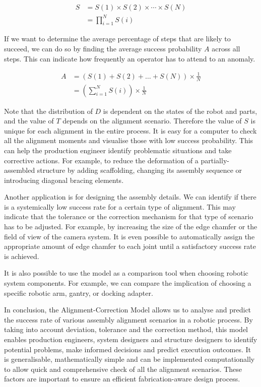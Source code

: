 \begin{align} \label{eq:total-probability-success}
    S &= S(1) \times S(2) \times \cdots \times S(N)\nonumber \\
      &= \prod_{i=1}^{N} S(i)
\end{align}

If we want to determine the average percentage of steps that are likely to succeed, we can do so by finding the average success probability $A$ across all steps. This can indicate how frequently an operator has to attend to an anomaly.

\begin{align} \label{eq:average-step-success-probability}
    A &= (S(1) + S(2) + \ldots + S(N)) \times \frac{1}{N}\nonumber \\
      &= \left(\sum_{i=1}^{N} S(i)\right) \times \frac{1}{N}
\end{align}

Note that the distribution of $D$ is dependent on the states of the robot and parts, and the value of $T$ depends on the alignment scenario. Therefore the value of $S$ is unique for each alignment in the entire process. It is easy for a computer to check all the alignment moments and visualise those with low success probability. This can help the production engineer identify problematic situations and take corrective actions. For example, to reduce the deformation of a partially-assembled structure by adding scaffolding, changing its assembly sequence or introducing diagonal bracing elements.

Another application is for designing the assembly details. We can identify if there is a systemically low success rate for a certain type of alignment. This may indicate that the tolerance or the correction mechanism for that type of scenario has to be adjusted. For example, by increasing the size of the edge chamfer or the field of view of the camera system. It is even possible to automatically assign the appropriate amount of edge chamfer to each joint until a satisfactory success rate is achieved.

It is also possible to use the model as a comparison tool when choosing robotic system components. For example, we can compare the implication of choosing a specific robotic arm, gantry, or docking adapter. 

In conclusion, the Alignment-Correction Model allows us to analyse and predict the success rate of various assembly alignment scenarios in a robotic process. By taking into account deviation, tolerance and the correction method, this model enables production engineers, system designers and structure designers to identify potential problems, make informed decisions and predict execution outcomes. It is generalisable, mathematically simple and can be implemented computationally to allow quick and comprehensive check of all the alignment scenarios. These factors are important to ensure an efficient fabrication-aware design process.

